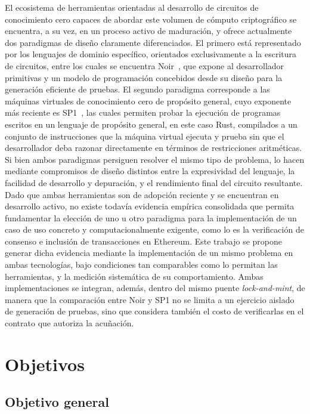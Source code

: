 El ecosistema de herramientas orientadas al desarrollo de circuitos de conocimiento cero
capaces de abordar este volumen de cómputo criptográfico se encuentra, a su vez, en un proceso
activo de maduración, y ofrece actualmente dos paradigmas de diseño claramente diferenciados.
El primero está representado por los lenguajes de dominio específico, orientados
exclusivamente a la escritura de circuitos, entre los cuales se encuentra Noir~\cite{noirlang},
que expone al desarrollador primitivas y un modelo de programación concebidos desde su diseño
para la generación eficiente de pruebas. El segundo paradigma corresponde a las máquinas
virtuales de conocimiento cero de propósito general, cuyo exponente más reciente es
SP1~\cite{succinctsp1}, las cuales permiten probar la ejecución de programas escritos en un
lenguaje de propósito general, en este caso Rust, compilados a un conjunto de instrucciones que
la máquina virtual ejecuta y prueba sin que el desarrollador deba razonar directamente en
términos de restricciones aritméticas. Si bien ambos paradigmas persiguen resolver el mismo
tipo de problema, lo hacen mediante compromisos de diseño distintos entre la expresividad del
lenguaje, la facilidad de desarrollo y depuración, y el rendimiento final del circuito
resultante. Dado que ambas herramientas son de adopción reciente y se encuentran en desarrollo
activo, no existe todavía evidencia empírica consolidada que permita fundamentar la elección de
uno u otro paradigma para la implementación de un caso de uso concreto y computacionalmente
exigente, como lo es la verificación de consenso e inclusión de transacciones en Ethereum. Este
trabajo se propone generar dicha evidencia mediante la implementación de un mismo
problema en ambas tecnologías, bajo condiciones tan comparables como lo permitan las
herramientas, y la medición sistemática de su comportamiento. Ambas implementaciones se integran,
además, dentro del mismo puente \textit{lock-and-mint}, de manera que la comparación entre Noir y
SP1 no se limita a un ejercicio aislado de generación de pruebas, sino que considera también el
costo de verificarlas en el contrato que autoriza la acuñación.

\section{Objetivos}

\subsection{Objetivo general}

